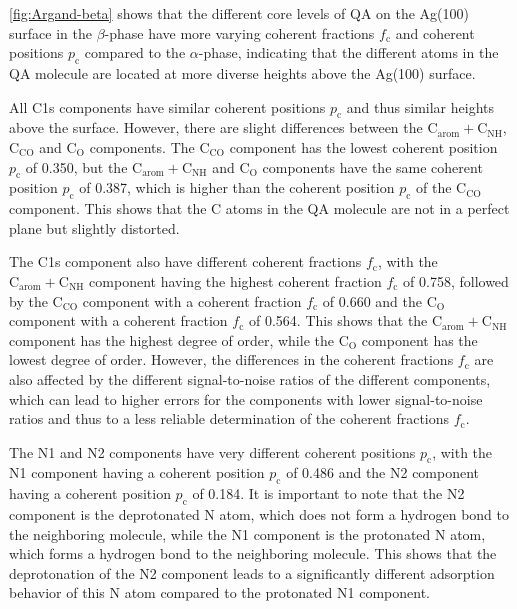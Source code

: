 \autoref{fig:Argand-beta} shows that the different core levels of \ac{QA} on the Ag(100) surface in the $\beta$-phase have more varying coherent fractions $f_\mathrm{c}$ and coherent positions $p_\mathrm{c}$ compared to the $\alpha$-phase, indicating that the different atoms in the \ac{QA} molecule are located at more diverse heights above the Ag(100) surface. 

All C1s components have similar coherent positions $p_\mathrm{c}$ and thus similar heights above the surface. However, there are slight differences between the $\mathrm{C_{arom}}+\mathrm{C_{NH}}$, $\mathrm{C_{CO}}$ and $\mathrm{C_{O}}$ components. The $\mathrm{C_{CO}}$ component has the lowest coherent position $p_\mathrm{c}$ of 0.350, but the $\mathrm{C_{arom}}+\mathrm{C_{NH}}$ and $\mathrm{C_{O}}$ components have the same coherent position $p_\mathrm{c}$ of 0.387, which is higher than the coherent position $p_\mathrm{c}$ of the $\mathrm{C_{CO}}$ component. This shows that the C atoms in the \ac{QA} molecule are not in a perfect plane but slightly distorted.

The C1s component also have different coherent fractions $f_\mathrm{c}$, with the $\mathrm{C_{arom}}+\mathrm{C_{NH}}$ component having the highest coherent fraction $f_\mathrm{c}$ of 0.758, followed by the $\mathrm{C_{CO}}$ component with a coherent fraction $f_\mathrm{c}$ of 0.660 and the $\mathrm{C_{O}}$ component with a coherent fraction $f_\mathrm{c}$ of 0.564. This shows that the $\mathrm{C_{arom}}+\mathrm{C_{NH}}$ component has the highest degree of order, while the $\mathrm{C_{O}}$ component has the lowest degree of order. However, the differences in the coherent fractions $f_\mathrm{c}$ are also affected by the different signal-to-noise ratios of the different components, which can lead to higher errors for the components with lower signal-to-noise ratios and thus to a less reliable determination of the coherent fractions $f_\mathrm{c}$.

The N1 and N2 components have very different coherent positions $p_\mathrm{c}$, with the N1 component having a coherent position $p_\mathrm{c}$ of 0.486 and the N2 component having a coherent position $p_\mathrm{c}$ of 0.184. It is important to note that the N2 component is the deprotonated N atom, which does not form a hydrogen bond to the neighboring molecule, while the N1 component is the protonated N atom, which forms a hydrogen bond to the neighboring molecule. This shows that the deprotonation of the N2 component leads to a significantly different adsorption behavior of this N atom compared to the protonated N1 component.

